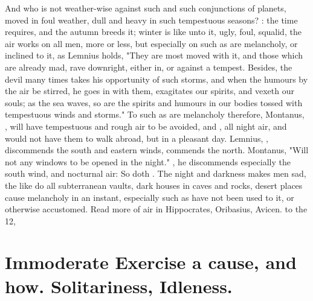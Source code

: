 And who is not weather-wise against such and such conjunctions of planets,
moved in foul weather, dull and heavy in such tempestuous seasons?
: the time requires,
and the autumn breeds it; winter is like unto it, ugly, foul, squalid, the air
works on all men, more or less, but especially on such as are melancholy, or
inclined to it, as Lemnius holds, "They are most moved
with it, and those which are already mad, rave downright, either in, or against
a tempest. Besides, the devil many times takes his opportunity of such storms,
and when the humours by the air be stirred, he goes in with them, exagitates
our spirits, and vexeth our souls; as the sea waves, so are the spirits and
humours in our bodies tossed with tempestuous winds and storms." To such as are
melancholy therefore, Montanus, , will have
tempestuous and rough air to be avoided, and ,
all night air, and would not have them to walk abroad, but in a pleasant day.
Lemnius, , discommends the south and eastern
winds, commends the north. Montanus, 
"Will not any windows to be opened in the night."
, he discommends especially
the south wind, and nocturnal air: So doth \Plutarch{}. The
night and darkness makes men sad, the like do all subterranean vaults, dark
houses in caves and rocks, desert places cause melancholy in an instant,
especially such as have not been used to it, or otherwise accustomed. Read more
of air in Hippocrates, 
Oribasius,  Avicen.
 to the 12,
\etc{}

\section[Immoderate Exercise, Idleness]{Immoderate Exercise a cause, and how.
Solitariness, Idleness.}

